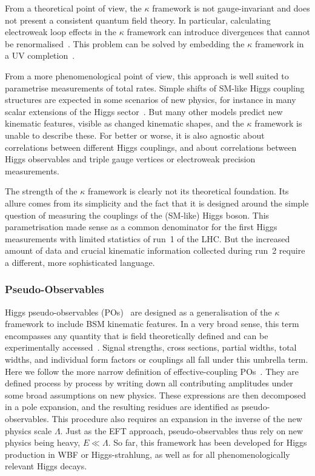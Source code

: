 From a theoretical point of view, the $\kappa$ framework is not
gauge-invariant and does not present a consistent quantum field
theory. In particular, calculating electroweak loop effects in the
$\kappa$ framework can introduce divergences that cannot be
renormalised~\cite{Passarino:2012cb}. This problem can be solved by
embedding the $\kappa$ framework in a UV
completion~\cite{Lopez-Val:2013yba}.

From a more phenomenological point of view, this approach is well
suited to parametrise measurements of total rates. Simple shifts of
SM-like Higgs coupling structures are expected in some scenarios of
new physics, for instance in many scalar extensions of the Higgs
sector~\cite{Lopez-Val:2013yba}. But many other models predict new
kinematic features, visible as changed kinematic shapes, and the
$\kappa$ framework is unable to describe these. For better or worse,
it is also agnostic about correlations between different Higgs
couplings, and about correlations between Higgs observables and triple
gauge vertices or electroweak precision measurements.

The strength of the $\kappa$ framework is clearly not its theoretical
foundation. Its allure comes from its simplicity and the fact that it
is designed around the simple question of measuring the couplings of
the (SM-like) Higgs boson. This parametrisation made sense as a
common denominator for the first Higgs measurements with limited
statistics of run~1 of the LHC. But the increased amount of data and
crucial kinematic information collected during run~2 require a
different, more sophisticated language.



\subsubsection{Pseudo-Observables}

Higgs pseudo-observables (POs)~\cite{Isidori:2013cga, Bordone:2015nqa,
  Greljo:2015sla} are designed as a generalisation of the $\kappa$
framework to include BSM kinematic features. In a very broad sense,
this term encompasses any quantity that is field theoretically defined
and can be experimentally accessed~\cite{Krause:2016uhw}. Signal
strengths, cross sections, partial widths, total widths, and
individual form factors or couplings all fall under this umbrella
term. Here we follow the more narrow definition of effective-coupling
POs~\cite{deFlorian:2016spz}. They are defined process by process by
writing down all contributing amplitudes under some broad assumptions
on new physics. These expressions are then decomposed in a pole
expansion, and the resulting residues are identified as
pseudo-observables. This procedure also requires an expansion in the
inverse of the new physics scale $\Lambda$. Just as the EFT approach,
pseudo-observables thus rely on new physics being heavy,
$E \ll \Lambda$. So far, this framework has been developed for Higgs
production in WBF or Higgs-strahlung, as well as for all
phenomenologically relevant Higgs decays.

